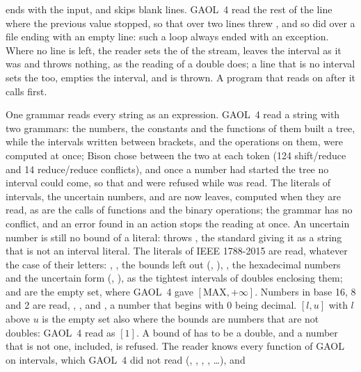 \medskip
{} ends with the input, and skips blank lines.\newinvfive{}
GAOL~4 read the rest of the line where the previous value stopped, so that
 over two lines threw , and so
did  over a file ending with an empty line: such a loop
always ended with an exception. Where no line is left, the reader sets the
 of the stream, leaves the interval as it was and throws
nothing, as the reading of a double does; a line that is no interval sets the
 too, empties the interval, and 
is thrown. A program that reads on after it calls  first.

\medskip
One grammar reads every string as an expression.\newinvfive{} GAOL~4 read a
string with two grammars: the numbers, the constants and the functions of
them built a tree, while the intervals written between brackets, and the
operations on them, were computed at once; Bison chose between the two at
each token (124 shift/reduce and 14 reduce/reduce conflicts), and once a
number had started the tree no interval could come, so that 
and  were refused while  was read. The
literals of intervals, the uncertain numbers,  and 
are now leaves, computed when they are read, as are the calls of functions
and the binary operations; the grammar has no conflict, and an error found
in an action stops the reading at once. An uncertain number is still no
bound of a literal: \code{[5?1]} throws , the
standard giving it as a string that is not an interval literal. The literals
of IEEE 1788-2015 are read, whatever the case of their letters: \code{[ ]},
\code{[entire]}, the bounds left out (\code{[1,]}, \code{[,]}),
, the hexadecimal numbers and the uncertain form
(, ), as the tightest intervals of doubles
enclosing them; \code{[inf]} and  are the empty set, where
GAOL~4 gave $[\mathrm{MAX}, +\infty]$. Numbers in base 16, 8 and 2 are read,
, ,  and , a number that
begins with 0 being decimal. $[l, u]$ with $l$ above $u$ is the empty set
also where the bounds are numbers that are not doubles: GAOL~4 read
\code{[1.00000000000000001, 1]} as $[1]$. A bound of  has to be
a double, and a number that is not one,  included, is refused. The
reader knows every function of GAOL on intervals, which GAOL~4 did not read
(, , , , \ldots), and
